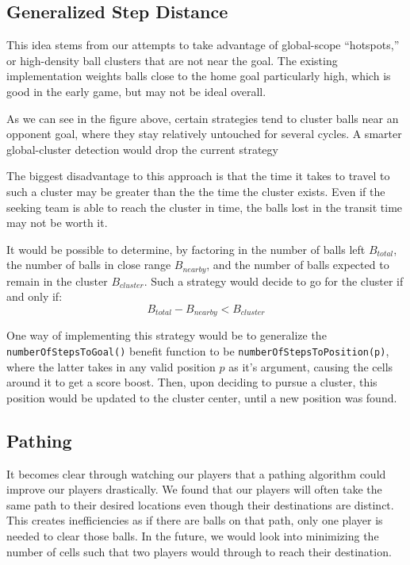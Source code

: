\documentclass[
10pt, %
letterpaper, %
oneside, %
headinclude,footinclude, %
english
]{article}
\begin{document}
\subsection{Generalized Step Distance}
This idea stems from our attempts to take advantage of global-scope “hotspots,” or high-density ball clusters that are not near the goal. The existing implementation weights balls close to the home goal particularly high, which is good in the early game, but may not be ideal overall. 

As we can see in the figure above, certain strategies tend to cluster balls near an opponent goal, where they stay relatively untouched for several cycles. A smarter global-cluster detection would drop the current strategy 

The biggest disadvantage to this approach is that the time it takes to travel to such a cluster may be greater than the the time the cluster exists. Even if the seeking team is able to reach the cluster in time, the balls lost in the transit time may not be worth it.

It would be possible to determine, by factoring in the number of balls left $B_{total}$, the number of balls in close range $B_{nearby}$, and the number of balls expected to remain in the cluster $B_{cluster}$. Such a strategy would decide to go for the cluster if and only if: 
$$B_{total} - B_{nearby} < B_{cluster}$$

One way of implementing this strategy would be to generalize the  \texttt{numberOfStepsToGoal()} benefit function to be \texttt{numberOfStepsToPosition(p)}, where the latter takes in any valid position $p$ as it’s argument, causing the cells around it to get a score boost. Then, upon deciding to pursue a cluster, this position would be updated to the cluster center, until a new position was found.

\subsection{Pathing}
It becomes clear through watching our players that a pathing algorithm could improve our players drastically. We found that our players will often take the same path to their desired locations even though their destinations are distinct. This creates inefficiencies as if there are balls on that path, only one player is needed to clear those balls. In the future, we would look into minimizing the number of cells such that two players would through to reach their destination. 
\end{document}
